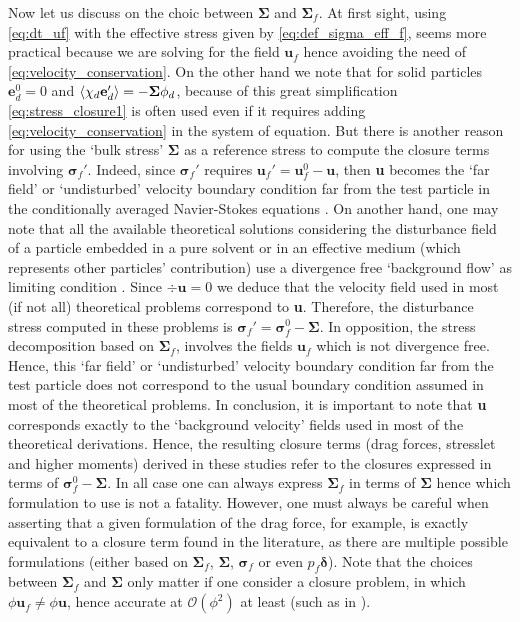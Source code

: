 Now let us discuss on the choic between $\bm\Sigma$ and $\bm\Sigma_f$. 
At first sight, using \ref{eq:dt_uf} with the effective stress given by \ref{eq:def_sigma_eff_f}, seems more practical because we are solving for the field $\textbf{u}_f$ hence avoiding the need of \ref{eq:velocity_conservation}. 
On the other hand we note that for solid particles $\textbf{e}_d^0 = 0$ and $\left<\chi_d \textbf{e}_d'\right> = -\bm\Sigma\phi_d$, because of this great simplification \ref{eq:stress_closure1} is often used \citep{jackson2000} even if it requires adding \ref{eq:velocity_conservation} in the system of equation.  
But there is another reason for using the `bulk stress' $\bm\Sigma$ as a reference stress to compute the closure terms involving $\bm\sigma_f'$. 
Indeed, since $\bm\sigma_f'$ requires $\textbf{u}_f' = \textbf{u}_f^0 - \textbf{u}$, then \textbf{u} becomes the `far field' or `undisturbed' velocity boundary condition far from the test particle in the conditionally averaged Navier-Stokes equations .
On another hand, one may note that all the available theoretical solutions considering the disturbance field of a particle embedded in a pure solvent or in an effective medium (which represents other particles' contribution) use a divergence free `background flow' as limiting condition \citep{kim1985modelling,hinch1977averaged}.
Since $\div \textbf{u} =0$ we deduce that the velocity field used in most (if not all) theoretical problems correspond to \textbf{u}. 
Therefore, the disturbance  stress computed in these problems is $\bm\sigma_f'= \bm\sigma_f^0 - \bm\Sigma$. 
In opposition, the stress decomposition based on $\bm\Sigma_f$, involves the fields $\textbf{u}_f$ which is not divergence free. 
Hence, this `far field' or `undisturbed' velocity boundary condition far from the test particle does not correspond to the usual boundary condition assumed in most of the theoretical problems. 
In conclusion, it is important to note that \textbf{u} corresponds exactly to the `background velocity' fields used in most of the theoretical derivations.
Hence, the resulting closure terms (drag forces, stresslet and higher moments) derived in these studies refer to the closures expressed in terms of $\bm\sigma_f^0 - \bm\Sigma$.
In all case one can always express $\bm\Sigma_f$ in terms of $\bm\Sigma$ hence which formulation to use is not a fatality. 
However, one must always be careful when asserting that a given formulation of the drag force, for example, is exactly equivalent to a closure term found in the literature, as there are multiple possible formulations  (either based on $\bm\Sigma_f$, $\bm\Sigma$, $\bm\sigma_f$ or even  $p_f \bm\delta$). 
Note that the choices between $\bm\Sigma_f$ and $\bm\Sigma$ only matter if one consider a closure problem, in which $\phi \textbf{u}_f \neq \phi \textbf{u}$, hence accurate at $\mathcal{O}(\phi^2)$ at least (such as in \citet{hinch1977averaged,kim1985modelling}). 


